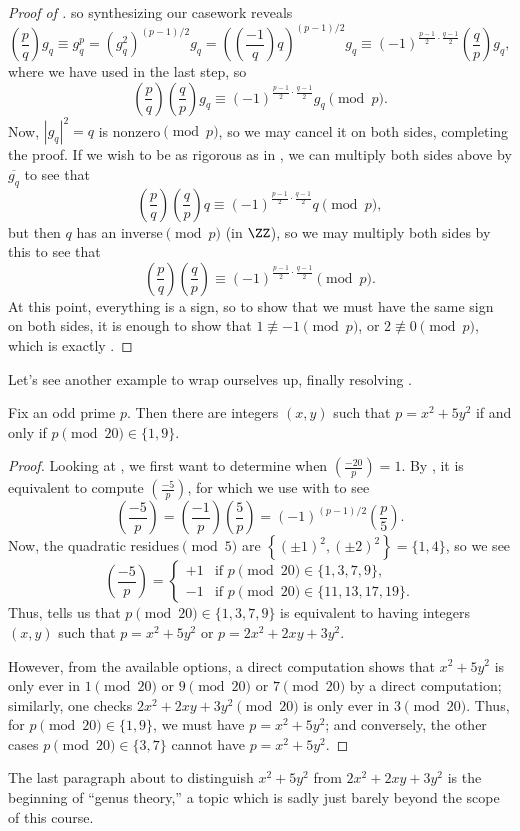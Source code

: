 \documentclass[../notes.tex]{subfiles}
\begin{document}
\begin{proof}[Proof of ]
	so synthesizing our casework reveals
	\[\left(\frac pq\right)g_q\equiv g_q^p=\left(g_q^2\right)^{(p-1)/2}g_q=\left(\left(\frac{-1}q\right)q\right)^{(p-1)/2}g_q\equiv(-1)^{\frac{p-1}2\cdot\frac{q-1}2}\left(\frac qp\right)g_q,\]
	where we have used  in the last step, so
	\[\left(\frac pq\right)\left(\frac qp\right)g_q\equiv(-1)^{\frac{p-1}2\cdot\frac{q-1}2}g_q\pmod p.\]
	Now, $\left|g_q\right|^2=q$ is nonzero$\pmod p$, so we may cancel it on both sides, completing the proof. If we wish to be as rigorous as in , we can multiply both sides above by $\overline{g_q}$ to see that
	\[\left(\frac pq\right)\left(\frac qp\right)q\equiv(-1)^{\frac{p-1}2\cdot\frac{q-1}2}q\pmod p,\]
	but then $q$ has an inverse$\pmod p$ (in $\ZZ$), so we may multiply both sides by this to see that
	\[\left(\frac pq\right)\left(\frac qp\right)\equiv(-1)^{\frac{p-1}2\cdot\frac{q-1}2}\pmod p.\]
	At this point, everything is a sign, so to show that we must have the same sign on both sides, it is enough to show that $1\not\equiv-1\pmod p$, or $2\not\equiv0\pmod p$, which is exactly .
\end{proof}
Let's see another example to wrap ourselves up, finally resolving .
\begin{example} \label{ex:full-primes-of-form-5}
	Fix an odd prime $p$. Then there are integers $(x,y)$ such that $p=x^2+5y^2$ if and only if $p\pmod{20}\in\{1,9\}$.
\end{example}
\begin{proof}
	Looking at , we first want to determine when $\left(\frac{-20}p\right)=1$. By , it is equivalent to compute $\left(\frac{-5}p\right)$, for which we use  with  to see
	\[\left(\frac{-5}p\right)=\left(\frac{-1}p\right)\left(\frac5p\right)=(-1)^{(p-1)/2}\left(\frac p5\right).\]
	Now, the quadratic residues$\pmod5$ are $\left\{(\pm1)^2,(\pm2)^2\right\}=\{1,4\}$, so we see
	\[\left(\frac{-5}p\right)=\begin{cases}
		+1 & \text{if }p\pmod{20}\in\{1,3,7,9\}, \\
		-1 & \text{if }p\pmod{20}\in\{11,13,17,19\}.
	\end{cases}\]
	Thus,  tells us that $p\pmod{20}\in\{1,3,7,9\}$ is equivalent to having integers $(x,y)$ such that $p=x^2+5y^2$ or $p=2x^2+2xy+3y^2$.
	
	However, from the available options, a direct computation shows that $x^2+5y^2$ is only ever in $1\pmod{20}$ or $9\pmod{20}$ or $7\pmod{20}$ by a direct computation; similarly, one checks $2x^2+2xy+3y^2\pmod{20}$ is only ever in $3\pmod{20}$. Thus, for $p\pmod{20}\in\{1,9\}$, we must have $p=x^2+5y^2$; and conversely, the other cases $p\pmod{20}\in\{3,7\}$ cannot have $p=x^2+5y^2$.
\end{proof}
\begin{remark}
	The last paragraph about to distinguish $x^2+5y^2$ from $2x^2+2xy+3y^2$ is the beginning of ``genus theory,'' a topic which is sadly just barely beyond the scope of this course.
\end{remark}
\end{document}
